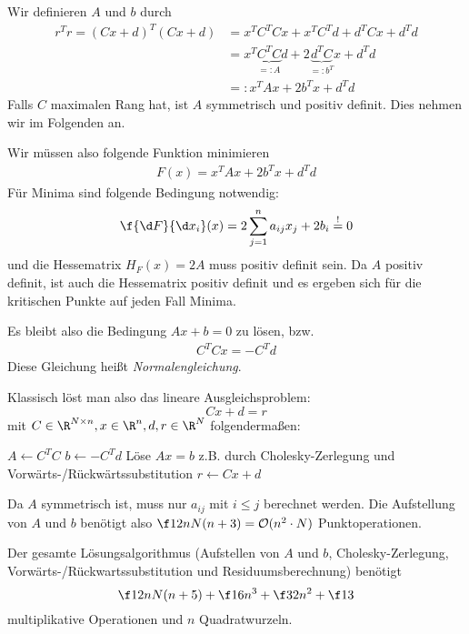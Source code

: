 \documentclass{mycourse}
\begin{document}
Wir definieren $A$ und $b$ durch
\begin{align}
	r^Tr = (Cx+d)^T(Cx+d) &= x^TC^TCx + x^TC^Td + d^TCx + d^Td \\
	\label{eq:5.4}
																					   &= x^T\underbrace{C^TC}_{=:A}d + 2\underbrace{d^TC}_{=:b^T}x + d^T d \\
						   &=: x^TAx + 2b^Tx +d^Td
\end{align}
Falls $C$ maximalen Rang hat, ist $A$ symmetrisch und positiv definit.
Dies nehmen wir im Folgenden an.

Wir müssen also folgende Funktion minimieren
\begin{align}
	\label{eq:5.5}
	F(x) = x^TAx + 2b^Tx + d^Td
\end{align}
Für Minima sind folgende Bedingung notwendig:
\begin{align}
	\label{eq:5.6}
	\f {\d F}{\d x_i}(x) = 2\sum_{j=1}^n a_{ij}x_j + 2b_i \stackrel != 0
\end{align}
und die Hessematrix $H_F(x) = 2A$ muss positiv definit sein.
Da $A$ positiv definit, ist auch die Hessematrix positiv definit und es ergeben sich für die kritischen Punkte auf jeden Fall Minima.

Es bleibt also die Bedingung $Ax + b=0$ zu lösen, bzw.
\begin{align}
	\label{eq:5.7}
	C^TCx = -C^Td
\end{align}
Diese Gleichung heißt \emph{Normalengleichung}.

Klassisch löst man also das lineare Ausgleichsproblem:
\[
	Cx + d = r
\]
mit $C\in \R^{N\times n}, x\in \R^n, d,r\in \R^N$ folgendermaßen:

\begin{alg}
	\label{alg:5.1}
	
	\begin{algorithmic}
		\State $A \gets C^TC$
		\State $b \gets -C^Td$
		\State Löse $Ax=b$ z.B. durch Cholesky-Zerlegung und Vorwärts-/Rückwärtssubstitution
		\State $r \gets Cx+d$ 
	\end{algorithmic}

	Da $A$ symmetrisch ist, muss nur $a_{ij}$ mit $i\le j$ berechnet werden.
	Die Aufstellung von $A$ und $b$ benötigt also $\f12 nN(n+3) = \mathcal O(n^2\cdot N)$ Punktoperationen.
	
	Der gesamte Lösungsalgorithmus (Aufstellen von $A$ und $b$, Cholesky-Zerlegung, Vorwärts-/Rückwartssubstitution und Residuumsberechnung) benötigt
	\[
		\f 12 nN(n+5) +\f16 n^3 +\f32 n^2+\f13
	\]
	multiplikative Operationen und $n$ Quadratwurzeln.
\end{alg}
\end{document}
